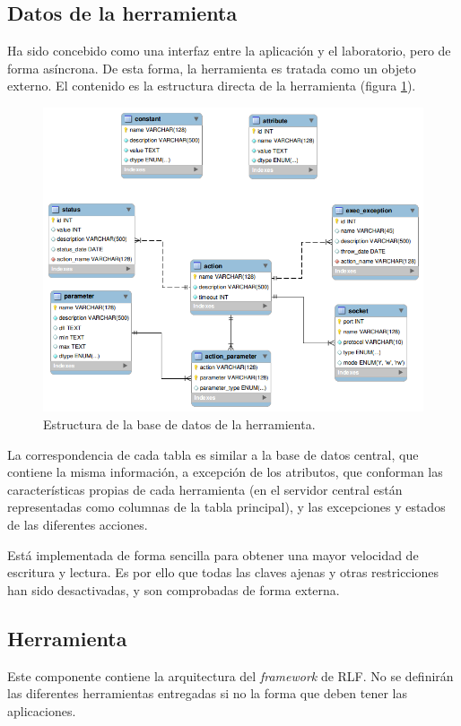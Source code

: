 \subsection{Datos de la herramienta}
Ha sido concebido como una interfaz entre la aplicación y el 
laboratorio, pero de forma asíncrona. De esta forma, la herramienta es 
tratada como un objeto externo. El contenido es la estructura directa 
de la herramienta (figura \ref{fig:erherramienta}). 

\begin{figure}[h]
	\centering
	\includegraphics[scale=0.65]{images/tool.png}
	\caption[E-R de la herramienta]{Estructura de la base de datos de 
	la herramienta.}
	\label{fig:erherramienta}
\end{figure}

La correspondencia de cada tabla es similar a la base de datos 
central, que contiene la misma información, a excepción de los 
atributos, que conforman las características propias de cada 
herramienta (en el servidor central están representadas como columnas 
de la tabla principal), y las excepciones y estados de las diferentes 
acciones.

Está implementada de forma sencilla para obtener una mayor velocidad 
de escritura y lectura. Es por ello que todas las claves ajenas y otras 
restricciones han sido desactivadas, y son comprobadas de forma 
externa.

\subsection{Herramienta}
Este componente contiene la arquitectura del \emph{framework} de RLF. 
No se definirán las diferentes herramientas entregadas si no la forma 
que deben tener las aplicaciones.


